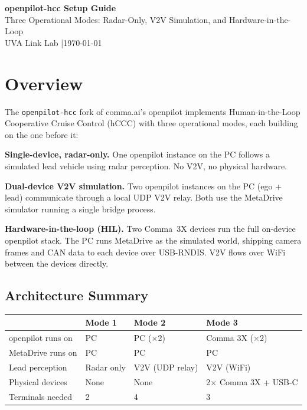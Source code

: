 \documentclass[11pt, letterpaper]{article}
\newcommand{\repo}{\texttt{openpilot-hcc}}
\begin{document}
\begin{center}
  {\LARGE\bfseries openpilot-hcc Setup Guide} \\[6pt]
  {\large Three Operational Modes: Radar-Only, V2V Simulation, and Hardware-in-the-Loop} \\[12pt]
  UVA Link Lab \quad|\quad \today
\end{center}

\tableofcontents
\newpage

\section{Overview}

The \repo{} fork of comma.ai's openpilot implements Human-in-the-Loop
Cooperative Cruise Control (hCCC) with three operational modes, each
building on the one before it:

\begin{description}[leftmargin=2em, labelwidth=2em]
  \item[Mode 1] \textbf{Single-device, radar-only.}
    One openpilot instance on the PC follows a simulated lead vehicle
    using radar perception. No V2V, no physical hardware.
  \item[Mode 2] \textbf{Dual-device V2V simulation.}
    Two openpilot instances on the PC (ego + lead) communicate through a
    local UDP V2V relay.  Both use the MetaDrive simulator running a
    single bridge process.
  \item[Mode 3] \textbf{Hardware-in-the-loop (HIL).}
    Two Comma~3X devices run the full on-device openpilot stack.  The PC
    runs MetaDrive as the simulated world, shipping camera frames and CAN
    data to each device over USB-RNDIS.  V2V flows over WiFi between the
    devices directly.
\end{description}

\subsection{Architecture Summary}

\begin{center}
\begin{tabular}{@{}llll@{}}
\toprule
  & \textbf{Mode 1} & \textbf{Mode 2} & \textbf{Mode 3} \\
\midrule
openpilot runs on & PC & PC ($\times$2) & Comma 3X ($\times$2) \\
MetaDrive runs on & PC & PC & PC \\
Lead perception   & Radar only & V2V (UDP relay) & V2V (WiFi) \\
Physical devices  & None & None & 2$\times$ Comma 3X + USB-C \\
Terminals needed  & 2 & 4 & 3 \\
\bottomrule
\end{tabular}
\end{center}
\end{document}
